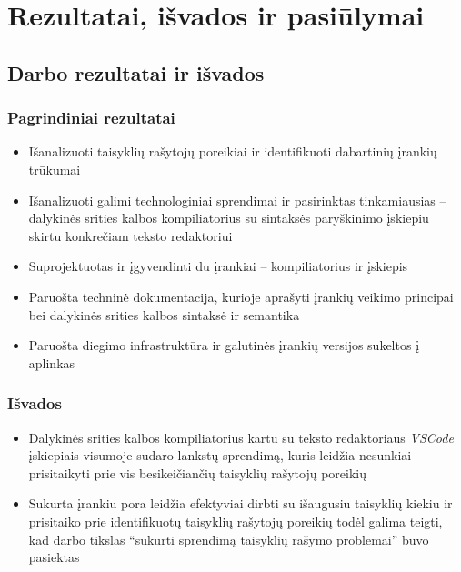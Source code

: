 \section{Rezultatai, išvados ir pasiūlymai}

\subsection{Darbo rezultatai ir išvados}

\subsubsection*{Pagrindiniai rezultatai}

\begin{itemize}
    \item Išanalizuoti taisyklių rašytojų poreikiai ir identifikuoti dabartinių įrankių trūkumai
    \item Išanalizuoti galimi technologiniai sprendimai ir pasirinktas tinkamiausias -- dalykinės srities kalbos kompiliatorius su sintaksės paryškinimo įskiepiu skirtu konkrečiam teksto redaktoriui
    \item Suprojektuotas ir įgyvendinti du įrankiai -- kompiliatorius ir įskiepis
    \item Paruošta techninė dokumentacija, kurioje aprašyti įrankių veikimo principai bei dalykinės srities kalbos sintaksė ir semantika
    \item Paruošta diegimo infrastruktūra ir galutinės įrankių versijos sukeltos į aplinkas
\end{itemize}

\subsubsection*{Išvados}

\begin{itemize}
    \item Dalykinės srities kalbos kompiliatorius kartu su teksto redaktoriaus \textit{VSCode} įskiepiais visumoje sudaro lankstų sprendimą, kuris leidžia nesunkiai prisitaikyti prie vis besikeičiančių taisyklių rašytojų poreikių
    \item Sukurta įrankiu pora leidžia efektyviai dirbti su išaugusiu taisyklių kiekiu ir prisitaiko prie identifikuotų taisyklių rašytojų poreikių todėl galima teigti, kad darbo tikslas \enquote{sukurti sprendimą taisyklių rašymo problemai} buvo pasiektas
\end{itemize}

